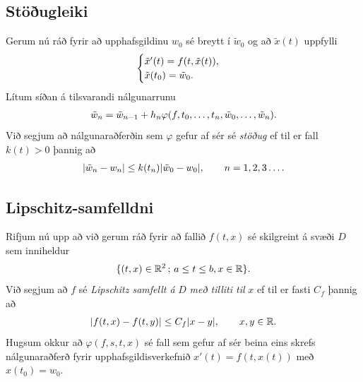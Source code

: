 \documentclass[letterpaper,10pt,icelandic]{sphinxmanual}
\begin{document}
\subsection{Stöðugleiki}
\label{kafli06:index-20}\label{kafli06:stougleiki}
Gerum nú ráð fyrir að upphafsgildinu \(w_0\) sé breytt í
\(\tilde w_0\) og að \(\tilde x(t)\) uppfylli
\begin{gather}
\begin{split}\begin{cases}
  \tilde x'(t)=f(t,\tilde x(t)),\\
\tilde x(t_0)=\tilde w_0.
\end{cases}\end{split}\notag
\end{gather}
Lítum síðan á tilsvarandi nálgunarrunu
\begin{gather}
\begin{split}\tilde w_n=\tilde w_{n-1}+h_n\varphi(f,t_0,\dots,t_n,\tilde
w_0,\dots,\tilde w_n).\end{split}\notag
\end{gather}
Við segjum að nálgunaraðferðin sem \(\varphi\)
gefur af sér sé \emph{stöðug} ef til er fall \(k(t)>0\) þannig að
\begin{gather}
\begin{split}|\tilde w_n-w_n|\leq k(t_n)|\tilde w_0-w_0|, \qquad n=1,2,3\dots.\end{split}\notag
\end{gather}

\subsection{Lipschitz-samfelldni}
\label{kafli06:index-21}\label{kafli06:lipschitz-samfelldni}
Rifjum nú upp að við gerum ráð fyrir að fallið \(f(t,x)\) sé
skilgreint á svæði \(D\) sem inniheldur
\begin{gather}
\begin{split}\{(t,x)\in {{\mathbb  R}}^2 \, ;\, a\leq t\leq b, x\in {{\mathbb  R}}\}.\end{split}\notag
\end{gather}
Við segjum að \(f\) sé \emph{Lipschitz samfellt á} \(D\) \emph{með tilliti
til} \(x\) ef til er fasti \(C_f\) þannig að
\begin{gather}
\begin{split}|f(t,x)-f(t,y)|\leq C_f|x-y|, \qquad x,y\in {{\mathbb  R}}.\end{split}\notag
\end{gather}
Hugsum okkur að \(\varphi(f,s,t,x)\) sé fall sem gefur af sér beina
eins skrefs nálgunaraðferð fyrir upphafsgildisverkefnið
\(x'(t)=f(t,x(t))\) með \(x(t_0)=w_0\).
\end{document}
